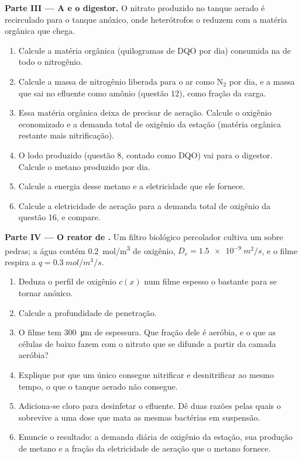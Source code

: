 \begin{problem}
\medskip
\noindent\textbf{Parte III --- A  e o digestor.}
O nitrato produzido no tanque aerado é recirculado para o tanque
anóxico, onde heterótrofos o reduzem com a matéria orgânica que chega.
\begin{enumerate}[resume]
  \item Calcule a matéria orgânica (quilogramas de DQO por dia)
        consumida na  de todo o nitrogênio.
  \item Calcule a massa de nitrogênio liberada para o ar como
        $\mathrm{N_2}$ por dia, e a massa que sai no efluente
        como amônio (questão 12), como fração da carga.
  \item Essa matéria orgânica deixa de precisar de aeração. Calcule o
        oxigênio economizado e a demanda total de oxigênio da estação
        (matéria orgânica restante mais nitrificação).
  \item O lodo produzido (questão 8, contado como DQO) vai para o
        digestor. Calcule o metano produzido por dia.
  \item Calcule a energia desse metano e a eletricidade que ele
        fornece.
  \item Calcule a eletricidade de aeração para a demanda total de
        oxigênio da questão 16, e compare.
\end{enumerate}

\medskip
\noindent\textbf{Parte IV --- O reator de .}
Um filtro biológico percolador cultiva um  sobre pedras; a água
contém \qty{0.2}{mol/m^3} de oxigênio, $D_e = \qty{1.5e-9}{m^2/s}$, e
o filme respira a $q = \qty{0.3}{mol/m^3/s}$.
\begin{enumerate}[resume]
  \item Deduza o perfil de oxigênio $c(x)$ num filme espesso o bastante
        para se tornar anóxico.
  \item Calcule a profundidade de penetração.
  \item O filme tem \qty{300}{\micro m} de espessura. Que fração dele é
        aeróbia, e o que as células de baixo fazem com o nitrato que se
        difunde a partir da camada aeróbia?
  \item Explique por que um único  consegue nitrificar e
        desnitrificar ao mesmo tempo, o que o tanque aerado não
        consegue.
  \item Adiciona-se cloro para desinfetar o efluente. Dê duas razões
        pelas quais o  sobrevive a uma dose que mata as mesmas
        bactérias em suspensão.
  \item Enuncie o resultado: a demanda diária de oxigênio da estação,
        sua produção de metano e a fração da eletricidade de aeração
        que o metano fornece.
\end{enumerate}
\end{problem}
